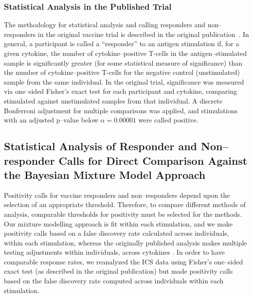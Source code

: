 \documentclass[11pt]{article}
\begin{document}
\subsubsection{Statistical Analysis in the Published Trial}
The methodology for statistical analysis and calling responders and non--responders in the original vaccine trial is described in the original publication~\cite{Peiperl:2010ej}. In general, a participant is called a ``responder'' to an antigen stimulation if, for a given cytokine, the number of cytokine--positive T-cells in the antigen--stimulated sample is significantly greater (for some statistical measure of significance) than the number of cytokine--positive T-cells for the negative control (unstimulated) sample from the same individual. In the original trial, significance was measured via one--sided Fisher's exact test for each participant and cytokine, comparing stimulated against unstimulated samples from that individual. A discrete Bonferroni adjustment for multiple comparisons was applied, and stimulations with an adjusted p--value below $\alpha = 0.00001$ were called positive. 


\subsection{Statistical Analysis of Responder and Non--responder Calls for Direct Comparison Against the Bayesian Mixture Model Approach}
Positivity calls for vaccine responders and non--responders depend upon the selection of an appropriate threshold. Therefore, to compare different methods of analysis, comparable thresholds for positivity must be selected for the methods. Our mixture modelling approach is fit within each stimulation, and we make positivity calls based on a false discovery rate calculated across individuals, within each stimulation, whereas the originally published analysis makes multiple testing adjustments within individuals, across cytokines . In order to have comparable response rates, we reanalyzed the ICS data using Fisher's one--sided exact test (as described in the original publication) but made positivity calls based on the false discovery rate computed across individuals within each stimulation.
\end{document}
